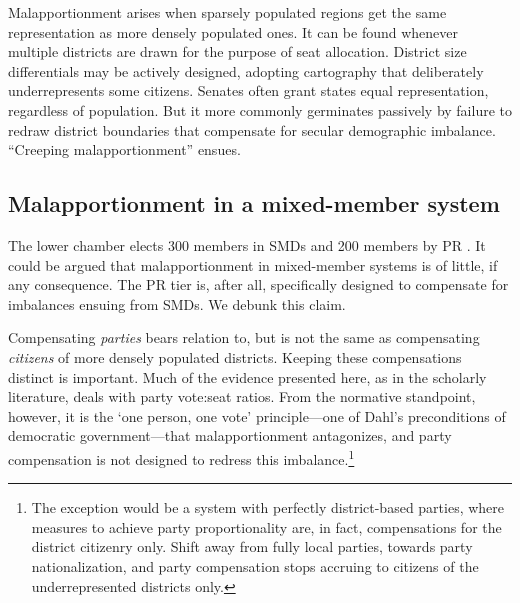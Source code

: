 \documentclass[letter,12pt]{article}
\begin{document}
\noindent Malapportionment arises when sparsely populated regions get the same representation as more densely populated ones. It can be found whenever multiple districts are drawn for the purpose of seat allocation. District size differentials may be actively designed, adopting cartography that deliberately underrepresents some citizens. Senates often grant states equal representation, regardless of population. But it more commonly germinates passively by failure to redraw district boundaries that compensate for secular demographic imbalance. ``Creeping malapportionment'' \citep{johnston.2002} ensues. 


\subsection{Malapportionment in a mixed-member system}

\noindent The lower chamber elects 300 members in SMDs and 200 members by PR \citep{weldonMixedMemberSys2001}. It could be argued that malapportionment in mixed-member systems is of little, if any consequence. The PR tier is, after all, specifically designed to compensate for imbalances ensuing from SMDs. We debunk this claim. 


Compensating \emph{parties} bears relation to, but is not the same as compensating \emph{citizens} of more densely populated districts. Keeping these compensations distinct is important. Much of the evidence presented here, as in the scholarly literature, deals with party vote:seat ratios. From the normative standpoint, however, it is the `one person, one vote' principle---one of Dahl's \citeyearpar{dahl.1972} preconditions of democratic government---that malapportionment antagonizes, and party compensation is not designed to redress this imbalance.\footnote{The exception would be a system with perfectly district-based parties, where measures to achieve party proportionality are, in fact, compensations for the district citizenry only. Shift away from fully local parties, towards party nationalization, and party compensation stops accruing to citizens of the underrepresented districts only.}
\end{document}
